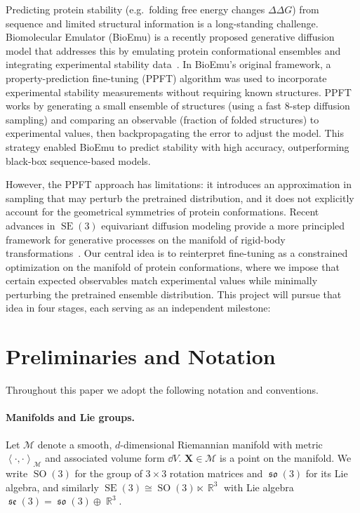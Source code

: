\documentclass{article}
\theoremstyle{plain}
\theoremstyle{definition}
\theoremstyle{remark}
\DeclareMathOperator{\SE}{SE}
\DeclareMathOperator{\SO}{SO}
\DeclareMathOperator{\se}{\mathfrak{se}}
\DeclareMathOperator{\so}{\mathfrak{so}}
\DeclareMathOperator{\R}{\mathbb{R}}
\newcommand{\inner}[2]{\left\langle #1, #2\right\rangle}
\begin{document}
Predicting protein stability (e.g.\ folding free energy changes $\Delta\Delta G$) from sequence and limited structural information is a long-standing challenge. Biomolecular Emulator (BioEmu) is a recently proposed generative diffusion model that addresses this by emulating protein conformational ensembles and integrating experimental stability data~\cite{bioemu}. In BioEmu's original framework, a property-prediction fine-tuning (PPFT) algorithm was used to incorporate experimental stability measurements without requiring known structures. PPFT works by generating a small ensemble of structures (using a fast $8$-step diffusion sampling) and comparing an observable (fraction of folded structures) to experimental values, then backpropagating the error to adjust the model. This strategy enabled BioEmu to predict stability with high accuracy, outperforming black-box sequence-based models.

However, the PPFT approach has limitations: it introduces an approximation in sampling that may perturb the pretrained distribution, and it does not explicitly account for the geometrical symmetries of protein conformations. Recent advances in $\SE(3)$ equivariant diffusion modeling provide a more principled framework for generative processes on the manifold of rigid-body transformations~\cite{se3_diffusion}. Our central idea is to reinterpret fine-tuning as a constrained optimization on the manifold of protein conformations, where we impose that certain expected observables match experimental values while minimally perturbing the pretrained ensemble distribution. This project will pursue that idea in four stages, each serving as an independent milestone:

\section{Preliminaries and Notation}

Throughout this paper we adopt the following notation and conventions.

\paragraph{Manifolds and Lie groups.}
Let $\mathcal{M}$ denote a smooth, $d$-dimensional Riemannian manifold with metric $\inner{\cdot}{\cdot}_{\mathcal{M}}$ and associated volume form $\dd V$. $\mathbf{X} \in \mathcal{M}$ is a point on the manifold. We write $\SO(3)$ for the group of $3\times3$ rotation matrices and $\so(3)$ for its Lie algebra, and similarly $\SE(3)\cong\SO(3)\ltimes\R^3$ with Lie algebra $\se(3)=\so(3)\oplus\R^3$.
\end{document}

